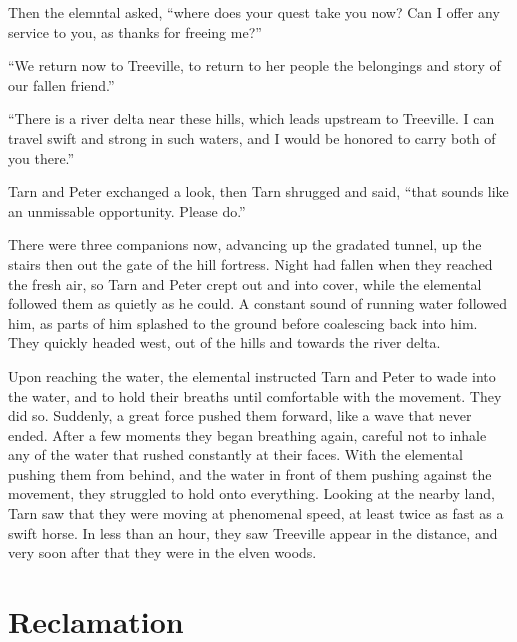 Then the elemntal asked, ``where does your quest take you now?  Can I offer any service to you, as thanks for freeing me?''

``We return now to Treeville, to return to her people the belongings and story of our fallen friend.''

``There is a river delta near these hills, which leads upstream to Treeville.  I can travel swift and strong in such waters, and I would be honored to carry both of you there.''

Tarn and Peter exchanged a look, then Tarn shrugged and said, ``that sounds like an unmissable opportunity.  Please do.''

There were three companions now, advancing up the gradated tunnel, up the stairs then out the gate of the hill fortress.  Night had fallen when they reached the fresh air, so Tarn and Peter crept out and into cover, while the elemental followed them as quietly as he could.  A constant sound of running water followed him, as parts of him splashed to the ground before coalescing back into him.  They quickly headed west, out of the hills and towards the river delta.

Upon reaching the water, the elemental instructed Tarn and Peter to wade into the water, and to hold their breaths until comfortable with the movement.  They did so.  Suddenly, a great force pushed them forward, like a wave that never ended.  After a few moments they began breathing again, careful not to inhale any of the water that rushed constantly at their faces.  With the elemental pushing them from behind, and the water in front of them pushing against the movement, they struggled to hold onto everything.  Looking at the nearby land, Tarn saw that they were moving at phenomenal speed, at least twice as fast as a swift horse.  In less than an hour, they saw Treeville appear in the distance, and very soon after that they were in the elven woods.

\chapter{Reclamation}
